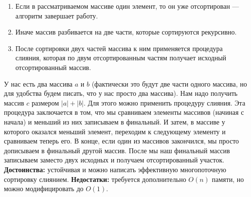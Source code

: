 \begin{enumerate}
    \item Если в рассматриваемом массиве один элемент, то он уже отсортирован — алгоритм завершает работу.
    \item Иначе массив разбивается на две части, которые сортируются рекурсивно.
    \item После сортировки двух частей массива к ним применяется процедура слияния, которая по двум отсортированным частям получает исходный отсортированный массив.
\end{enumerate}
У нас есть два массива $a$ и $b$ (фактически это будут две части одного массива, но для удобства будем писать, что у нас просто два массива). Нам надо получить массив $c$ размером $|a|+|b|$. Для этого можно применить процедуру слияния. Эта процедура заключается в том, что мы сравниваем элементы массивов (начиная с начала) и меньший из них записываем в финальный. И затем, в массиве у которого оказался меньший элемент, переходим к следующему элементу и сравниваем теперь его. В конце, если один из массивов закончился, мы просто дописываем в финальный другой массив. После мы наш финальный массив записываем заместо двух исходных и получаем отсортированный участок.
\newline \newline \textbf{Достоинства: } устойчивая и можно написать эффективную многопоточную сортировку слиянием.
\newline \textbf{Недостатки: } требуется дополнительно $O(n)$ памяти, но можно модифицировать до $O(1)$.

